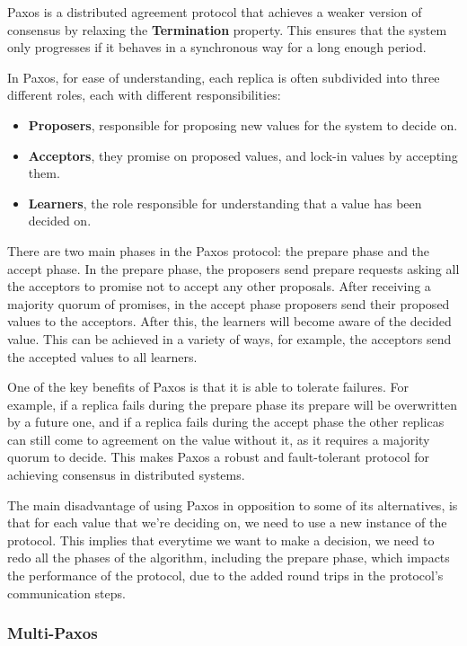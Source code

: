 \documentclass[sigconf]{acmart}
\begin{document}
Paxos is a distributed agreement protocol that achieves a weaker version of consensus by relaxing the \textbf{Termination} property. This ensures that the system only progresses if it behaves in a synchronous way for a long enough period.

In Paxos, for ease of understanding, each replica is often subdivided into three different roles, each with different responsibilities:

\begin{itemize}
    \item \textbf{Proposers}, responsible for proposing new values for the system to decide on.
    \item \textbf{Acceptors}, they promise on proposed values, and lock-in values by accepting them.
    \item \textbf{Learners}, the role responsible for understanding that a value has been decided on. 
\end{itemize}

There are two main phases in the Paxos protocol: the prepare phase and the accept phase. In the prepare phase, the proposers send prepare requests asking all the acceptors to promise not to accept any other proposals. After receiving a majority quorum of promises, in the accept phase proposers send their proposed values to the acceptors. After this, the learners will become aware of the decided value. This can be achieved in a variety of ways, for example, the acceptors send the accepted values to all learners.

One of the key benefits of Paxos is that it is able to tolerate failures. For example, if a replica fails during the prepare phase its prepare will be overwritten by a future one, and if a replica fails during the accept phase the other replicas can still come to agreement on the value without it, as it requires a majority quorum to decide. This makes Paxos a robust and fault-tolerant protocol for achieving consensus in distributed systems.

The main disadvantage of using Paxos in opposition to some of its alternatives, is that for each value that we're deciding on, we need to use a new instance of the protocol. This implies that everytime we want to make a decision, we need to redo all the phases of the algorithm, including the prepare phase, which impacts the performance of the protocol, due to the added round trips in the protocol's communication steps. 

\subsubsection{Multi-Paxos}
\end{document}
